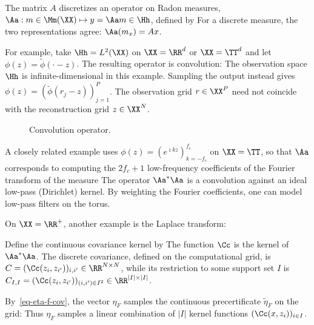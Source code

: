 The matrix $A$ discretizes an operator on Radon measures, $\Aa : m \in \Mm(\XX) \mapsto y = \Aa m \in \Hh$, defined by
For a discrete measure, the two representations agree: $\Aa(m_x)=A x$.

For example, take $\Hh=L^2(\XX)$ on $\XX=\RR^d$ or $\XX=\TT^d$ and let $\phi(z) = \tilde\phi(\cdot-z)$. The resulting operator is convolution:
The observation space $\Hh$ is infinite-dimensional in this example. Sampling the output instead gives $\phi(z) = (\tilde\phi(r_j-z))_{j=1}^P$. The observation grid $r \in \XX^P$ need not coincide with the reconstruction grid $z \in \XX^N$.




\begin{figure}[tbp]
\centering
{}
\caption{Convolution operator.}
\label{fig-spikes}
\end{figure}



A closely related example uses $\phi(z)=(e^{\imath k z})_{k=-f_c}^{f_c}$ on $\XX=\TT$, so that $\Aa$ corresponds to computing the $2f_c+1$ low-frequency coefficients of the Fourier transform of the measure
The operator $\Aa^*\Aa$ is a convolution against an ideal low-pass (Dirichlet) kernel. By weighting the Fourier coefficients, one can model low-pass filters on the torus.

On $\XX=\RR^+$, another example is the Laplace transform:

Define the continuous covariance kernel by
The function $\Cc$ is the kernel of $\Aa^* \Aa$.
%
The discrete covariance, defined on the computational grid, is $C=(\Cc(z_i,z_{i'}))_{i,i'} \in \RR^{N \times N}$, while its restriction to some support set $I$ is $C_{I,I}=(\Cc(z_i,z_{i'}))_{(i,i')\in I^2}\in\RR^{|I|\times|I|}$.

By~\eqref{eq-eta-f-cov}, the vector $\eta_F$ samples the continuous precertificate $\tilde\eta_F$ on the grid:
Thus $\eta_F$ samples a linear combination of $|I|$ kernel functions $(\Cc(x,z_i))_{i \in I}$.

